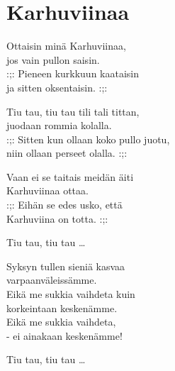 \section{Karhuviinaa}
Ottaisin minä Karhuviinaa,\\
jos vain pullon saisin.\\
:;: Pieneen kurkkuun kaataisin\\
ja sitten oksentaisin. :;:

Tiu tau, tiu tau tili tali tittan,\\
juodaan rommia kolalla.\\
:;: Sitten kun ollaan koko pullo juotu,\\
niin ollaan perseet olalla. :;:

Vaan ei se taitais meidän äiti\\
Karhuviinaa ottaa.\\
:;: Eihän se edes usko, että\\
Karhuviina on totta. :;:

Tiu tau, tiu tau …

Syksyn tullen sieniä kasvaa\\
varpaanväleissämme.\\
Eikä me sukkia vaihdeta kuin\\
korkeintaan keskenämme.\\
Eikä me sukkia vaihdeta,\\
- ei ainakaan keskenämme!

Tiu tau, tiu tau …